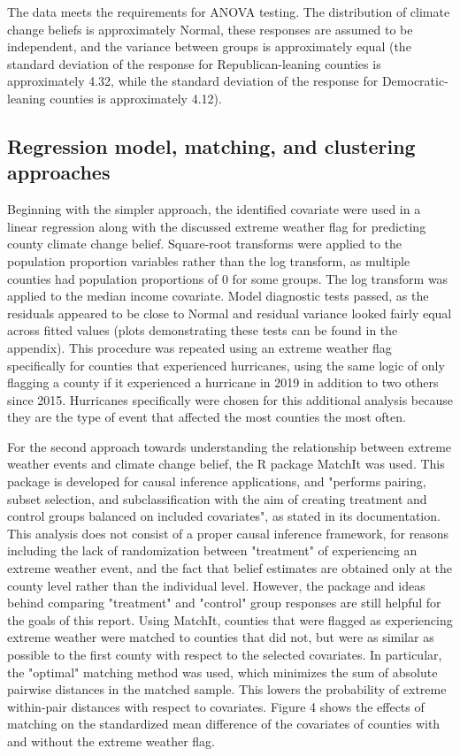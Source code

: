 \documentclass{article}
\begin{document}
The data meets the requirements for ANOVA testing. The distribution of climate change beliefs is approximately Normal, these responses are assumed to be independent, and the variance between groups is approximately equal (the standard deviation of the response for Republican-leaning counties is approximately 4.32, while the standard deviation of the response for Democratic-leaning counties is approximately 4.12). 

\subsection{Regression model, matching, and clustering approaches}
Beginning with the simpler approach, the identified covariate were used in a linear regression along with the discussed extreme weather flag for predicting county climate change belief. Square-root transforms were applied to the population proportion variables rather than the log transform, as multiple counties had population proportions of 0 for some groups. The log transform was applied to the median income covariate. Model diagnostic tests passed, as the residuals appeared to be close to Normal and residual variance looked fairly equal across fitted values (plots demonstrating these tests can be found in the appendix). This procedure was repeated using an extreme weather flag specifically for counties that experienced hurricanes, using the same logic of only flagging a county if it experienced a hurricane in 2019 in addition to two others since 2015. Hurricanes specifically were chosen for this additional analysis because they are the type of event that affected the most counties the most often. 

For the second approach towards understanding the relationship between extreme weather events and climate change belief, the R package MatchIt was used. This package is developed for causal inference applications, and "performs pairing, subset selection, and subclassification with the aim of creating treatment and control groups balanced on included covariates", as stated in its documentation. This analysis does not consist of a proper causal inference framework, for reasons including the lack of randomization between "treatment" of experiencing an extreme weather event, and the fact that belief estimates are obtained only at the county level rather than the individual level. However, the package and ideas behind comparing "treatment" and "control" group responses are still helpful for the goals of this report. Using MatchIt, counties that were flagged as experiencing extreme weather were matched to counties that did not, but were as similar as possible to the first county with respect to the selected covariates. In particular, the "optimal" matching method was used, which minimizes the sum of absolute pairwise distances in the matched sample. This lowers the probability of extreme within-pair distances with respect to covariates. Figure 4 shows the effects of matching on the standardized mean difference of the covariates of counties with and without the extreme weather flag.
\end{document}
